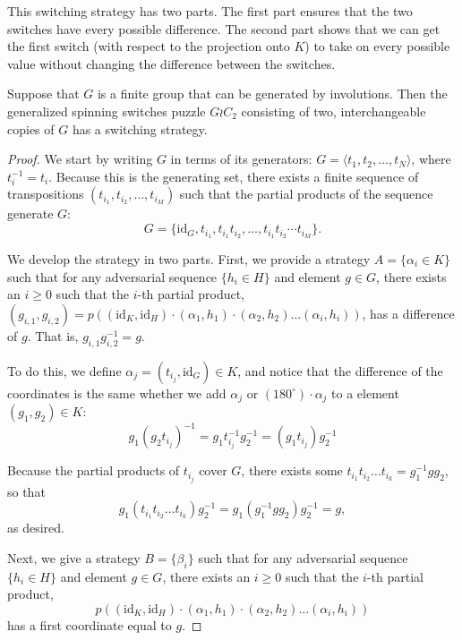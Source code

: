 This switching strategy has two parts.
The first part ensures that the two switches have every possible difference.
The second part shows that we can get the first switch
(with respect to the projection onto $K$) to take on every possible value
without changing the difference between the switches.
\begin{theorem}
  Suppose that $G$ is a finite group that can be generated by involutions.
  Then the generalized spinning switches puzzle $G \wr C_2$ consisting of two,
  interchangeable copies of $G$ has a switching strategy.
  \label{thm:involutionGeneratedGroups}
\end{theorem}
\begin{proof}
  We start by writing $G$ in terms of its generators:
  $G = \langle t_1, t_2, \dots, t_N \rangle$, where $t_i^{-1} = t_i$.
  Because this is the generating set, there exists a finite sequence of
  transpositions $(t_{i_1}, t_{i_2}, \dots, t_{i_M})$
  such that the partial products of the sequence generate $G$: \begin{equation}
    G = \{\mathrm{id}_G, t_{i_1}, t_{i_1}t_{i_2}, \dots, t_{i_1}t_{i_2}\cdots t_{i_M}\}.
  \end{equation}

  We develop the strategy in two parts. First, we provide a strategy
  $A = \{\alpha_i \in K\}$ such that for any adversarial sequence $\{h_i \in H\}$
  and element $g \in G$, there exists an $i \geq 0$
  such that the {$i$-th} partial product,
  $(g_{i,1}, g_{i,2}) = p((\mathrm{id}_K, \mathrm{id}_H)\cdot(\alpha_1, h_1)\cdot(\alpha_2, h_2)\dots(\alpha_i, h_i))$,
  has a difference of $g$. That is, $g_{i,1}g_{i,2}^{-1} = g$.

  To do this, we define $\alpha_j = (t_{i_j}, \mathrm{id}_G) \in K$,
  and notice that the difference of the coordinates is the same whether we
  add $\alpha_j$ or $(180^\circ)\cdot \alpha_j$ to a element
  $(g_1, g_2) \in K$: \begin{equation}
    g_1(g_2t_{i_j})^{-1} = g_1t_{i_j}^{-1}g_2^{-1} = (g_1t_{i_j})g_2^{-1}
  \end{equation}

  Because the partial products of $t_{i_j}$ cover $G$, there exists some
  $t_{i_1} t_{i_2}\dots t_{i_k} = g_1^{-1}gg_2$, so that
  \begin{equation}
    g_1(t_{i_1} t_{i_2}\dots t_{i_k})g_2^{-1}
    = g_1(g_1^{-1}gg_2)g_2^{-1}
    = g,
  \end{equation}
  as desired.

  Next, we give a strategy $B = \{\beta_i\}$ such that for any adversarial
  sequence $\{h_i \in H\}$ and element $g \in G$, there exists an $i \geq 0$
  such that the {$i$-th} partial product,
  \begin{equation}
    p((\mathrm{id}_K, \mathrm{id}_H)\cdot(\alpha_1, h_1)\cdot(\alpha_2, h_2)\dots(\alpha_i, h_i))
  \end{equation}
  has a first coordinate equal to $g$.


\end{proof}
